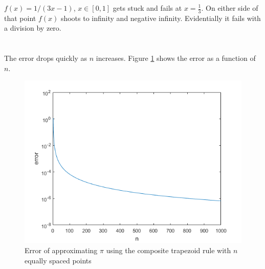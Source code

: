 \documentclass[12pt]{article}
\begin{document}
$f(x) = 1/(3x-1)$, $x \in [0, 1]$ gets stuck and fails at $x=\frac{1}{3}$. On either side of that point $f(x)$ shoots to infinity and negative infinity. Evidentially it fails with a division by zero.


\section{}

\section{}

The error drops quickly as $n$ increases. Figure \ref{fig_pi_err} shows the error as a function of $n$.

\begin{figure}
    \includegraphics[width=\linewidth]{pi_err2}
    \centering
    \caption{Error of approximating $\pi$ using the composite trapezoid rule with $n$ equally spaced points}
    \label{fig_pi_err}
\end{figure}
\end{document}
